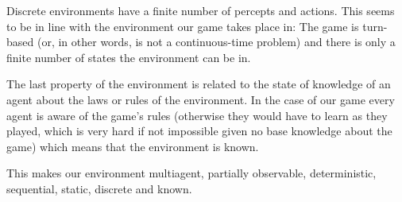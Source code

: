 \documentclass{article}
\begin{document}
Discrete environments have a finite number of percepts and actions. This seems to be in line with the environment our game takes place in: The game is turn-based (or, in other words, is not a continuous-time problem) and there is only a finite number of states the environment can be in. 

The last property of the environment is related to the state of knowledge of an agent about the laws or rules of the environment. In the case of our game every agent is aware of the game's rules (otherwise they would have to learn as they played, which is very hard if not impossible given no base knowledge about the game) which means that the environment is known.

This makes our environment multiagent, partially observable, deterministic, sequential, static, discrete and known.
\end{document}
